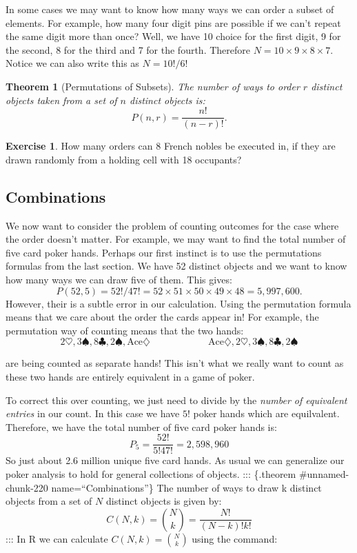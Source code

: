 \documentclass[
]{book}
\newtheorem{theorem}{Theorem}[chapter]
\theoremstyle{definition}
\theoremstyle{definition}
\theoremstyle{definition}
\newtheorem{exercise}{Exercise}[chapter]
\theoremstyle{definition}
\theoremstyle{remark}
\begin{document}
In some cases we may want to know how many ways we can order a subset of elements. For example, how many four digit pins are possible if we can't repeat the same digit more than once? Well, we have 10 choice for the first digit, 9 for the second, 8 for the third and 7 for the fourth. Therefore \(N=10\times9\times8\times7\). Notice we can also write this as \(N=10!/6!\)

\begin{theorem}[Permutations of Subsets]
\protect\hypertarget{thm:unnamed-chunk-218}{}\label{thm:unnamed-chunk-218}The number of ways to order \(r\) distinct objects taken from a set of \(n\) distinct objects is: \[P(n,r)=\frac{n!}{(n-r)!}.\]
\end{theorem}

\begin{exercise}
\protect\hypertarget{exr:unnamed-chunk-219}{}\label{exr:unnamed-chunk-219}How many orders can 8 French nobles be executed in, if they are drawn randomly from a holding cell with 18 occupants?
\end{exercise}

\hypertarget{combinations}{%
\subsection{Combinations}\label{combinations}}

We now want to consider the problem of counting outcomes for the case where the order doesn't matter. For example, we may want to find the total number of five card poker hands. Perhaps our first instinct is to use the permutations formulas from the last section. We have 52 distinct objects and we want to know how many ways we can draw five of them. This gives: \[P(52,5)=52!/47!=52\times 51\times50\times49\times48=5,997,600.\] However, their is a subtle error in our calculation. Using the permutation formula means that we care about the order the cards appear in! For example, the permutation way of counting means that the two hands:
\[ 
2 \heartsuit, 3 \spadesuit, 8 \clubsuit, 2 \spadesuit, \text{Ace} \diamondsuit \qquad \qquad \qquad \text{Ace} \diamondsuit, 2 \heartsuit, 3 \spadesuit, 8 \clubsuit, 2 \spadesuit
\]

are being counted as separate hands! This isn't what we really want to count as these two hands are entirely equivalent in a game of poker.

To correct this over counting, we just need to divide by the \emph{number of equivalent entries} in our count. In this case we have \(5!\) poker hands which are equilvalent. Therefore, we have the total number of five card poker hands is:
\[ P_5=\frac{52!}{5! 47!}=2,598,960 \]
So just about 2.6 million unique five card hands. As usual we can generalize our poker analysis to hold for general collections of objects.
::: \{.theorem \#unnamed-chunk-220 name=``Combinations''\}
The number of ways to draw k distinct objects from a set of \(N\) distinct objects is given by: \[ C(N,k)=\binom{N}{k}=\frac{N!}{(N-k)!k!}\]
:::
In R we can calculate \(C(N,k)=\binom{N}{k}\) using the command:
\end{document}
